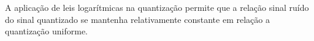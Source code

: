 A aplicação de leis logarítmicas na quantização permite que a relação sinal ruído do sinal quantizado se mantenha relativamente constante em relação a quantização uniforme.